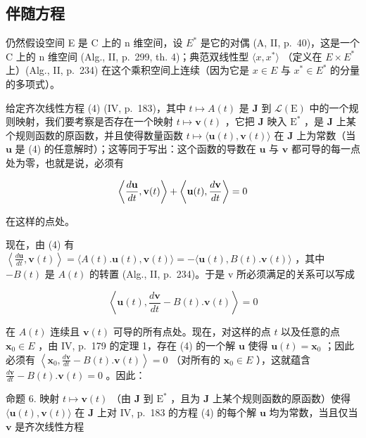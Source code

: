 \subsection{伴随方程}

仍然假设空间 E 是 C 上的 n 维空间，设 \(E^{*}\) 是它的对偶 (A, II, p.~40)，这是一个 C 上的 n 维空间 (Alg., II, p.~299, th. 4)；典范双线性型 \(\langle x, x^{*}\rangle\) （定义在 \(E \times E^{*}\) 上）(Alg., II, p.~234) 在这个乘积空间上连续（因为它是 \(x \in E\) 与 \(x^{*} \in E^{*}\) 的分量的多项式）。

给定齐次线性方程 (4) (IV, p.~183)，其中 \(t \mapsto A(t)\) 是 \(\mathbf{J}\) 到 \(\mathcal{L}(\mathrm{E})\) 中的一个规则映射，我们要考察是否存在一个映射 \(t \mapsto \mathbf{v}(t)\) ，它把 \(\mathbf{J}\) 映入 \(\mathrm{E}^*\) ，是 \(\mathbf{J}\) 上某个规则函数的原函数，并且使得数量函数 \(t \mapsto \langle \mathbf{u}(t), \mathbf{v}(t) \rangle\) 在 \(\mathbf{J}\) 上为常数（当 \(\mathbf{u}\) 是 (4) 的任意解时）；这等同于写出：这个函数的导数在 \(\mathbf{u}\) 与 \(\mathbf{v}\) 都可导的每一点处为零，也就是说，必须有

\[
\left\langle \frac {d {\bf u}}{d t}, {\bf v} (t) \right\rangle + \left\langle {\bf u} (t), \frac {d {\bf v}}{d t} \right\rangle = 0
\]

在这样的点处。

现在，由 (4) 有 \(\left\langle\frac{d\mathbf{u}}{dt},\mathbf{v}(t)\right\rangle=\langle A(t).\mathbf{u}(t),\mathbf{v}(t)\rangle=-\langle\mathbf{u}(t),B(t).\mathbf{v}(t)\rangle\) ，其中 \(-B(t)\) 是 \(A(t)\) 的转置 (Alg., II, p.~234)。于是 v 所必须满足的关系可以写成

\[
\left\langle \mathbf {u} (t), \frac {d \mathbf {v}}{d t} - B (t). \mathbf {v} (t) \right\rangle = 0
\]

在 \(A(t)\) 连续且 \(\mathbf{v}(t)\) 可导的所有点处。现在，对这样的点 \(t\) 以及任意的点 \(\mathbf{x}_0 \in E\) ，由 IV, p.~179 的定理 1，存在 (4) 的一个解 \(\mathbf{u}\) 使得 \(\mathbf{u}(t) = \mathbf{x}_0\) ；因此必须有 \(\left\langle \mathbf{x}_0, \frac{d\mathbf{v}}{dt} - B(t).\mathbf{v}(t) \right\rangle = 0\) （对所有的 \(\mathbf{x}_0 \in E\) ），这就蕴含 \(\frac{d\mathbf{v}}{dt} - B(t).\mathbf{v}(t) = 0\) 。因此：

命题 6. 映射 \(t \mapsto \mathbf{v}(t)\) （由 \(\mathbf{J}\) 到 \(\mathrm{E}^*\) ，且为 \(\mathbf{J}\) 上某个规则函数的原函数）使得 \(\langle \mathbf{u}(t), \mathbf{v}(t) \rangle\) 在 \(\mathbf{J}\) 上对 IV, p.~183 的方程 (4) 的每个解 \(\mathbf{u}\) 均为常数，当且仅当 \(\mathbf{v}\) 是齐次线性方程

